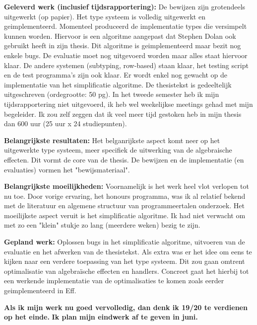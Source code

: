 \documentclass[12pt]{report}
\begin{document}
\vspace{1cm}
{\bf Geleverd werk (inclusief tijdsrapportering):} De bewijzen zijn grotendeels uitgewerkt (op papier). Het type systeem is volledig uitgewerkt en geimplementeerd. Momenteel produceerd de implementatie types die versimpelt kunnen worden. Hiervoor is een algoritme aangepast dat Stephen Dolan ook gebruikt heeft in zijn thesis. Dit algoritme is geimplementeerd maar bezit nog enkele bugs. De evaluatie moet nog uitgevoerd worden maar alles staat hiervoor klaar. De andere systemen (subtyping, row-based) staan klaar, het testing script en de test programma's zijn ook klaar. Er wordt enkel nog gewacht op de implementatie van het simplificatie algoritme. De thesistekst is gedeeltelijk uitgeschreven (ordegrootte: 50 pg). In het tweede semester heb ik mijn tijdsrapportering niet uitgevoerd, ik heb wel weekelijkse meetings gehad met mijn begeleider. Ik zou zelf zeggen dat ik veel meer tijd gestoken heb in mijn thesis dan 600 uur (25 uur x 24 studiepunten).

\vspace{1cm}
{\bf Belangrijkste resultaten:}
Het belganrijkste aspect komt neer op het uitgewerkte type systeem, meer specifiek de uitwerking van de algebraische effecten. Dit vormt de core van de thesis. De bewijzen en de implementatie (en evaluaties) vormen het "bewijsmateriaal".

\vspace{1cm}
{\bf Belangrijkste moeilijkheden:}
Voornamelijk is het werk heel vlot verlopen tot nu toe. Door vorige ervaring, het honours programma, was ik al relatief bekend met de literatuur en algemene structuur van programmeertalen onderzoek. Het moeilijkste aspect veruit is het simplificatie algoritme. Ik had niet verwacht om met zo een "klein" stukje zo lang (meerdere weken) bezig te zijn.

\vspace{1cm}
{\bf Gepland werk:}
Oplossen bugs in het simplificatie algoritme, uitvoeren van de evaluatie en het afwerken van de thesistekst. Als extra was er het idee om eens te kijken naar een verdere toepassing van het type systeem. Dit zou gaan omtrent optimalisatie van algebraïsche effecten en handlers. Concreet gaat het hierbij tot een werkende implementatie van de optimalisaties te komen zoals eerder geimplementeerd in Eff.

\vspace{1cm}
{\bf Als ik mijn werk nu goed vervolledig, dan denk ik 19/20 te verdienen op het einde.}
{\bf Ik plan mijn eindwerk af te geven in juni.}
\end{document}
